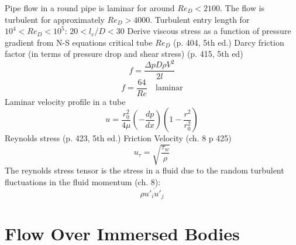 \documentclass{article}
\begin{document}
Pipe flow in a round pipe is laminar for around $Re_D < 2100$. The flow is turbulent for approximately $Re_D > 4000$.
\newline
\newline
Turbulent entry length for $10^4 < Re_D < 10^5$: $20 < l_e / D < 30$
\newline
\newline
Derive viscous stress as a function of pressure gradient from N-S equations
critical tube $Re_D$ (p. 404, 5th ed.)
\newline
\newline
Darcy friction factor (in terms of pressure drop and shear stress) (p. 415, 5th ed)
\begin{equation}
  f = \frac{\Delta p D \rho V^2}{2l}
\end{equation}
\begin{equation}
  f = \frac{64}{Re}\quad\text{laminar}
\end{equation}
\newline
\newline
Laminar velocity profile in a tube
\begin{equation}
  u = \frac{r_0^2}{4 \mu} \left(- \frac{d p}{d x}\right) \left(1 - \frac{r^2}{r_0^2}\right)
\end{equation}
\newline
\newline
Reynolds stress (p. 423, 5th ed.)
\newline
\newline
Friction Velocity (ch. 8 p 425)
\begin{equation}
  u_\tau = \sqrt{\frac{\tau_w}{\rho}}
\end{equation}
\newline
\newline
The reynolds stress tensor is the stress in a fluid due to the random turbulent fluctuations in the fluid momentum (ch. 8):
\begin{equation}
  \rho \overline{u'_i u'_j}
\end{equation}
\newline
\newline

%
%
\newpage
\section{Flow Over Immersed Bodies}
\end{document}
